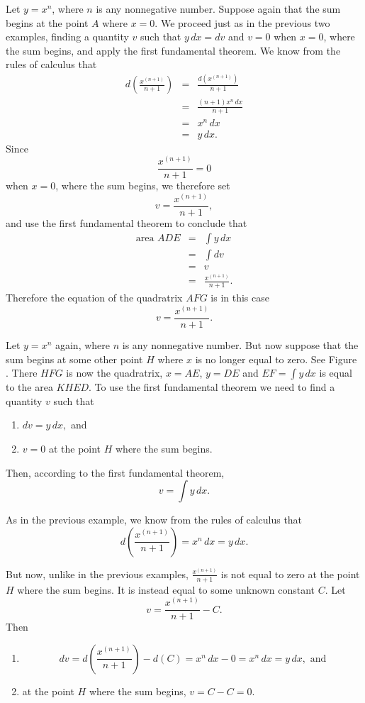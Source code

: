\item \label{intxn}Let $y=x^n$, where $n$ is any nonnegative number.  Suppose again that the sum begins at the point $A$ where $x=0$. We proceed just as in the previous two examples, finding a quantity $v$ such that $y\,dx = dv$ and $v=0$ when $x=0$, where the sum begins, and apply the first fundamental theorem.
We know from the rules of calculus that 
\setlength{\jot}{1.5ex}
\begin{eqnarray*}
d\left(\frac{x^{(n+1)}}{n+1}\right) & = & \frac{d(x^{(n+1)})}{n+1}\\
& = &\frac{(n+1)x^n\,dx}{n+1}\\
& = & x^n\,dx\\
& = & y\,dx.
\end{eqnarray*}
Since 
$$\frac{x^{(n+1)}}{n+1} =0$$
when $x=0$, where the sum begins, we therefore set
$$v = \frac{x^{(n+1)}}{n+1},$$
and use the first fundamental theorem to conclude that 
\begin{eqnarray*}
\mbox{area }ADE & = & \int\!y\,dx\\
& = & \int\!dv\\
&  = & v\\
& = & \frac{x^{(n+1)}}{n+1}.
\end{eqnarray*}
\setlength{\jot}{\oldjot}
Therefore the equation of the quadratrix $AFG$ is in this case 
$$v = \frac{x^{(n+1)}}{n+1}.$$

\item Let $y=x^n$ again, where $n$ is any nonnegative number.  But now suppose that the sum begins at some other point $H$ where $x$ is no longer equal to zero. See Figure~ .  There $HFG$ is now the quadratrix, $x = AE$, $y=DE$ and $EF = \int y\,dx$ is equal to the area $KHED$.  To use the first fundamental theorem we need to find a quantity $v$ such that 
\begin{enumerate}
\item $dv = y\,dx,$ and 
\item $v = 0$ at the point $H$ where the sum begins.
\end{enumerate}
Then, according to the first fundamental theorem,
$$v= \int y\,dx.$$



As in the previous example, we know from the rules of calculus that 
\setlength{\jot}{1.5ex}
$$
d\left(\frac{x^{(n+1)}}{n+1}\right)  =  x^n\,dx = y\,dx.
$$

But now, unlike in the previous examples,  $\frac{x^{(n+1)}}{n+1}$ is not equal to zero at the point $H$ where the sum begins.  It is instead equal to some unknown constant $C$.  Let 
$$v = \frac{x^{(n+1)}}{n+1} -C.$$
Then 
\begin{enumerate}
\item
$$dv = d\left(\frac{x^{(n+1)}}{n+1}\right) -d(C) = x^n\,dx - 0 = x^n\,dx = y\,dx,\mbox{ and}$$
\item at the point $H$ where the sum begins, $v= C - C = 0$.
\end{enumerate}

